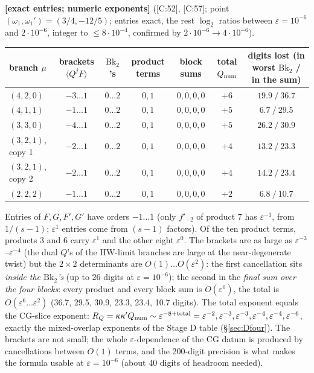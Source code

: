 \documentclass[10pt]{article}
\newcommand{\cl}[2]{\textsf{[#1:#2]}}
\newcommand{\tg}[1]{\textbf{[#1]}}
\newcommand{\Bk}{\mathrm{Bk}_2}
\begin{document}
\tg{exact entries; numeric exponents} (\cl{C}{52}, \cl{C}{57}; point $(\omega_1,\omega_1')=(3/4,-12/5)$; entries exact, the rest $\log_2$ ratios between $\varepsilon=10^{-6}$ and $2\cdot10^{-6}$, integer to $\le8\cdot10^{-4}$, confirmed by $2\cdot10^{-6}\to4\cdot10^{-6}$).
\begin{center}\small\setlength{\tabcolsep}{4pt}\begin{tabular}{@{}lcccccc@{}}\toprule
branch $\mu$ & brackets $\langle Q^jF\rangle$ & $\Bk$'s & product terms & block sums & total $Q_{\rm num}$ & digits lost (in worst $\Bk$ / in the sum) \\\midrule
$(4,2,0)$ & $-3\dots1$ & $0\dots2$ & $0,1$ & $0,0,0,0$ & $+6$ & $19.9\ /\ 36.7$ \\
$(4,1,1)$ & $-1\dots1$ & $0\dots2$ & $0,1$ & $0,0,0,0$ & $+5$ & $6.7\ /\ 29.5$ \\
$(3,3,0)$ & $-4\dots1$ & $0\dots2$ & $0,1$ & $0,0,0,0$ & $+5$ & $26.2\ /\ 30.9$ \\
$(3,2,1)$, copy 1 & $-2\dots1$ & $0\dots2$ & $0,1$ & $0,0,0,0$ & $+4$ & $13.2\ /\ 23.3$ \\
$(3,2,1)$, copy 2 & $-2\dots1$ & $0\dots2$ & $0,1$ & $0,0,0,0$ & $+4$ & $14.2\ /\ 23.4$ \\
$(2,2,2)$ & $-1\dots1$ & $0\dots2$ & $0,1$ & $0,0,0,0$ & $+2$ & $6.8\ /\ 10.7$ \\\bottomrule
\end{tabular}\end{center}
Entries of $F,G,F',G'$ have orders $-1\dots1$ (only $f'_{-2}$ of product 7 has $\varepsilon^{-1}$, from $1/(s-1)$; $\varepsilon^1$ entries come from $(s-1)$ factors). Of the ten product terms, products 3 and 6 carry $\varepsilon^1$ and the other eight $\varepsilon^0$. The brackets are as large as $\varepsilon^{-3}$--$\varepsilon^{-4}$ (the dual $Q$'s of the HW-limit branches are large at the near-degenerate twist) but the $2\times2$ determinants are $O(1)\dots O(\varepsilon^2)$: the first cancellation sits \emph{inside the $\Bk$'s} (up to 26 digits at $\varepsilon=10^{-6}$); the second in the \emph{final sum over the four blocks}: every product and every block sum is $O(\varepsilon^0)$, the total is $O(\varepsilon^6\dots\varepsilon^2)$ (36.7, 29.5, 30.9, 23.3, 23.4, 10.7 digits). The total exponent equals the CG-slice exponent: $R_Q=\kappa\kappa'Q_{\rm num}\sim\varepsilon^{-8+\mathrm{total}}=\varepsilon^{-2},\varepsilon^{-3},\varepsilon^{-3},\varepsilon^{-4},\varepsilon^{-4},\varepsilon^{-6}$, exactly the mixed-overlap exponents of the Stage D table (\S\ref{sec:Dfour}). The brackets are not small; the whole $\varepsilon$-dependence of the CG datum is produced by cancellations between $O(1)$ terms, and the 200-digit precision is what makes the formula usable at $\varepsilon=10^{-6}$ (about 40 digits of headroom needed).
\end{document}
